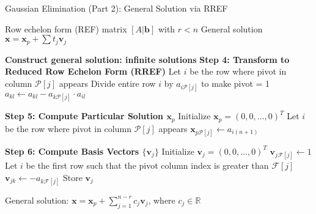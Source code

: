 \begin{algorithm}
	\caption{Gaussian Elimination (Part 2): General Solution via RREF}
	\begin{algorithmic}[1]
		\Require Row echelon form (REF) matrix $[A|\mathbf{b}]$ with $r < n$
		\Ensure General solution $\mathbf{x} = \mathbf{x}_p + \sum t_j \mathbf{v}_j$
		
		\State \textbf{Construct general solution: infinite solutions}
		\State \textbf{Step 4: Transform to Reduced Row Echelon Form (RREF)}
		\State Let $i$ be the row where pivot in column $\mathcal{P}[j]$ appears
		\State Divide entire row $i$ by $a_{i\mathcal{P}[j]}$ to make pivot = 1
		\State $a_{kl} \gets a_{kl} - a_{k\mathcal{P}[j]} \cdot a_{il}$
		\EndFor
		\EndFor
		\EndFor
		
		\State \textbf{Step 5: Compute Particular Solution $\mathbf{x}_p$}
		\State Initialize $\mathbf{x}_p = (0, 0, \dots, 0)^T$
		\State Let $i$ be the row where pivot in column $\mathcal{P}[j]$ appears
		\State $\mathbf{x}_{p\mathcal{P}[j]}\gets a_{i(n+1)}$
		\EndFor
		
		\State \textbf{Step 6: Compute Basis Vectors $\{\mathbf{v}_j\}$}
		\State Initialize $\mathbf{v}_j = (0, 0, \dots, 0)^T$
		\State $\mathbf{v}_{j\mathcal{F}[j]}\gets1$
		\State Let $i$ be the first row such that the pivot column index is greater than $\mathcal{F}[j]$
		\State $\mathbf{v}_{jk}\gets-a_{k\mathcal{F}[j]}$
		\EndFor
		\State Store $\mathbf{v}_j$
		\EndFor
		
		\State \Return General solution: $\mathbf{x} = \mathbf{x}_p + \sum\limits_{j=1}^{n-r} c_j \mathbf{v}_j$, where $c_j\in\mathbb{R}^{}$
	\end{algorithmic}
\end{algorithm}
